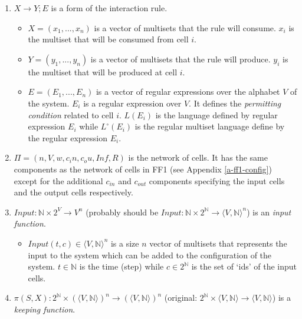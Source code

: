 \documentclass{article}
\newcommand{\ra}{\rightarrow}
\begin{document}
\begin{appendices}
\begin{enumerate}
   \item $X \ra Y; E$ is a form of the interaction rule. \label{a-ff3-rule}
         \begin{itemize}
         \item $X = (x_1,...,x_n)$ is a vector of multisets that the rule will consume. $x_i$ is the
               multiset that will be consumed from cell $i$.
         \item $Y = (y_1,...,y_n)$ is a vector of multisets that the rule will produce. $y_i$ is the
               multiset that will be produced at cell $i$.
         \item $E = (E_1,...,E_n)$ is a vector of regular expressions over the alphabet $V$ of the 
               system. $E_i$ is a regular expression over $V$. It defines the \emph{permitting 
               condition} related to cell $i$. $L(E_i)$ is the language defined by regular
               expression $E_i$ while $L^{\circ}(E_i)$ is the regular multiset language define by
               the regular expression $E_i$.
         \end{itemize}
   \item $\Pi = (n, V, w, c_in, c_ou, Inf, R)$ is the network of cells. It has the same components
         as the network of cells in FF1 (see Appendix \ref{a-ff1-config}) except for the additional
         $c_{in}$ and $c_{out}$ components specifying the input cells and the output cells 
         respectively. \label{a-ff3-net-cells}
   \item $Input: \mathbb{N} \times 2^{V} \ra V^n$ (probably should be $Input: \mathbb{N} \times 
         2^{\mathbb{N}}\ra \langle V, \mathbb{N}\rangle^n$) is an \emph{input function}. 
         \label{a-ff3-input}
         \begin{itemize}
         \item $Input(t,c) \in \langle V, \mathbb{N}\rangle^n$ is a size $n$ vector of multisets 
               that represents the input to the system which can be added to the configuration of 
               the system. $t \in \mathbb{N}$ is the time (step) while $c \in 2^{\mathbb{N}}$ is the
               set of `ids' of the input cells.
        \end{itemize}
   \item $\pi(S,X): 2^{\mathbb{N}} \times (\langle V, \mathbb{N}\rangle)^n \ra  (\langle V, 
         \mathbb{N}\rangle)^n$ (original: $2^{\mathbb{N}} \times \langle V,\mathbb{N}\rangle \ra
         \langle V,\mathbb{N}\rangle$) is a \emph{keeping function}. \label{a-ff3-keep}

\end{enumerate}
\end{appendices}
\end{document}
